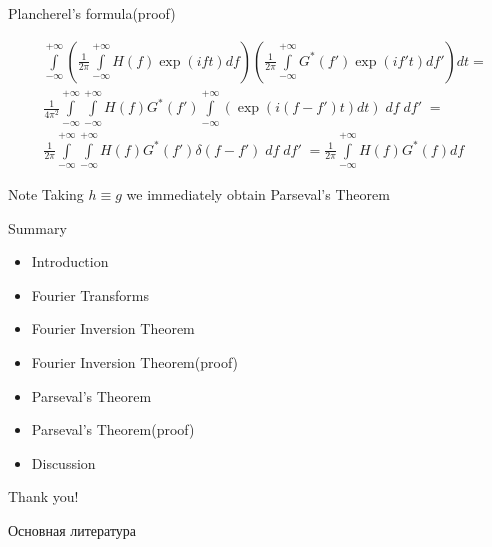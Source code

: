 \documentclass[10pt]{beamer}
\begin{document}
\begin{frame}{Plancherel’s formula(proof)}

\begin{align}
&\int \limits_{-\infty}^{+\infty} \left(\frac{1}{2\pi} \int \limits_{-\infty}^{+\infty} H(f) \exp(ift)df \right) \left(\frac{1}{2\pi} \int \limits_{-\infty}^{+\infty} G^*(f') \exp(if't)df' \right)dt  = \\
& \frac{1}{4\pi^2} \int \limits_{-\infty}^{+\infty} \int \limits_{-\infty}^{+\infty} H(f) G^*(f') \int \limits_{-\infty}^{+\infty} \left(\exp(i(f - f')t) dt\right)\; df\; df'\; = \\
& \frac{1}{2\pi} \int \limits_{-\infty}^{+\infty} \int \limits_{-\infty}^{+\infty} H(f) G^*(f')  \delta(f - f')\; df\; df'\; =  \frac{1}{2\pi} \int \limits_{-\infty}^{+\infty} H(f)G^*(f) df
\end{align}

\begin{block}{Note}
Taking $h \equiv g$  we immediately obtain Parseval’s Theorem
\end{block}

\end{frame}


\begin{frame}{Summary}
\begin{itemize}
    \item Introduction
    
    \item Fourier Transforms

    \item Fourier Inversion Theorem 
    
    \item Fourier Inversion Theorem(proof)
    
    \item Parseval’s Theorem
    
    \item Parseval’s Theorem(proof)
    
    \item Discussion
\end{itemize}
\end{frame}




\begin{frame}
\centering
\Large{Thank you!}
\end{frame}



{\small
\begin{frame}[allowframebreaks]{Основная литература}
    
    \nocite{*}
        
\end{frame}
}
\end{document}
